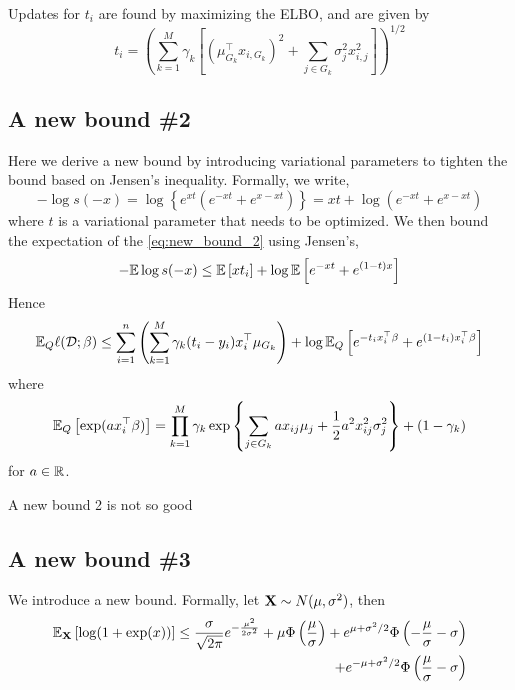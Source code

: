 Updates for $t_i$ are found by maximizing the ELBO, and are given by
\begin{equation}
    t_i = \left( 
	\sum_{k=1}^M \gamma_k \left[
	    (\mu_{G_k}^\top x_{i, G_k})^2 + \sum_{j \in G_k} \sigma_{j}^2 x_{i, j}^2
	\right]
    \right)^{1/2}
\end{equation}


\subsection{A new bound \#2}

Here we derive a new bound by introducing variational parameters to tighten the bound based on Jensen's inequality. Formally, we write,
\begin{equation} \label{eq:new_bound_2}
    -\log s(-x) 
    = \log \left\{ e^{x t} \left( e^{-x t} + e^{x - x t} \right) \right\}
    = x t + \log \left( e^{-x t} + e^{x - x t} \right)
\end{equation}
where $t$ is a variational parameter that needs to be optimized. We then bound the expectation of the \eqref{eq:new_bound_2} using Jensen's,
\begin{equation}
    -\mathbb{E} \log s(-x)
    \leq
    \mathbb{E} \left[ x t_i \right] + \log \mathbb{E} \left[ e^{-x t} + e^{(1-t)x} \right]
\end{equation}
Hence
\begin{equation}
    \mathbb{E}_Q \ell (\mathcal{D}; \beta) 
    \leq 
    \sum_{i=1}^n 
    \left( \sum_{k=1}^M \gamma_k (t_i - y_i) x^\top_i \mu_{G_k} \right)
    +
    \log \mathbb{E}_Q \left[ e^{-t_i x_i^\top \beta} + e^{(1-t_i)x_i^\top \beta} \right]
\end{equation}
where
\begin{equation*}
    \mathbb{E}_Q \left[ \exp(a x_i^\top \beta) \right]
    =	
	\prod_{k=1}^M \gamma_k \exp \left\{ 
	    \sum_{j \in G_k} 
	    a x_{ij} \mu_{j}
	    + 
	    \frac{1}{2} a^2 x_{ij}^2 \sigma_{j}^2
	\right\}
	+
	(1- \gamma_k)
\end{equation*}
for $a \in \mathbb{R}$.

A new bound 2 is not so good


\subsection{A new bound \#3}

We introduce a new bound. Formally, let $\mathbf{X} \sim N(\mu, \sigma^2)$, then
\begin{equation} \label{eq:new_tight}
\begin{aligned}
    \mathbb{E}_{\mathbf{X}} \left[ \log(1 + \exp(x)) \right] \leq
	\frac{\sigma}{\sqrt{2\pi}} e^{- \frac{\mu^2}{2 \sigma^2}}
	+ \mu \Phi \left(\frac{\mu}{\sigma} \right)
	+ e^{\mu + \sigma^2 / 2 }  \Phi \left( -\frac{\mu}{\sigma} - \sigma \right) \\
	+ e^{-\mu + \sigma^2 /2 } \Phi \left( \frac{\mu}{\sigma} - \sigma \right)
\end{aligned}
\end{equation}

